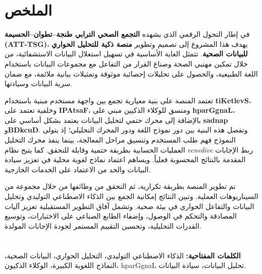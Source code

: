 \chapter*{\textarabic{الملخص}}
\begin{Arabic}
في إطار التحول الرقمي الذي يشهده \textbf{التجمع الصحي الترابي طنجة--تطوان--الحسيمة (ATT-TSG)}، يهدف هذا المشروع إلى تصميم وتطوير \textbf{منصة ذكية للتحليل الحواري للبيانات الصحية}. تتمثل الغاية الأساسية في تسهيل استغلال البيانات الاستشفائية، من خلال تمكين مهنيي الصحة وصناع القرار من التفاعل مع مجموعات البيانات باستخدام اللغة الطبيعية، والحصول على تحليلات إحصائية موثوقة وتمثيلات بيانية ملائمة، مع ضمان سرية البيانات وسيادتها.

تعتمد المنصة على بنية معيارية تجمع بين واجهة مستخدم مبنية باستخدام \textbf{tiKetlevS}، وخلفية تعتمد على \textbf{IPAtsaF}، ومنسق للوكلاء الذكيين مبني على \textbf{hparGgnaL}، بالإضافة إلى محرك حتمي لتحليل البيانات يعتمد بشكل أساسي على \textbf{sadnap} و\textbf{BDkcuD}. وتفصل هذه البنية بين دور نموذج اللغة ودور المحرك التحليلي؛ إذ يتولى النموذج فهم طلب المستخدم وتنسيق مراحل المعالجة، بينما ينفذ محرك التحليل العمليات الحسابية بطريقة حتمية وقابلة للتحقق. كما يتيح نظام \textit{ecnedive} ربط الإجابات المقدمة بالنتائج المحسوبة فعلياً. ويساهم اعتماد نماذج لغوية محلية في تعزيز سيادة البيانات والحد من الاعتماد على الخدمات الخارجية.

تم تطوير المنصة بطريقة تكرارية، ثم التحقق من وظائفها من خلال مجموعة من السيناريوهات العملية. وتبين النتائج إمكانية الجمع بين الذكاء الاصطناعي التوليدي وتحليل البيانات والتفاعل الحواري في بيئة صحية. وتشمل آفاق التطوير المستقبلية تعزيز آليات المصادقة والتحكم في الوصول، وإضفاء الطابع الصناعي على الاختبارات، وتوسيع القدرات التحليلية، وتحسين التقييم المستمر لجودة الإجابات المولدة.
\\
\\ 
\\ 
\textbf{الكلمات المفتاحية:} الذكاء الاصطناعي التوليدي، التحليل الحواري، البيانات الصحية، النماذج اللغوية الكبيرة، الوكلاء الذكيون، hparGgnaL تحليل البيانات، سيادة البيانات.
\end{Arabic}